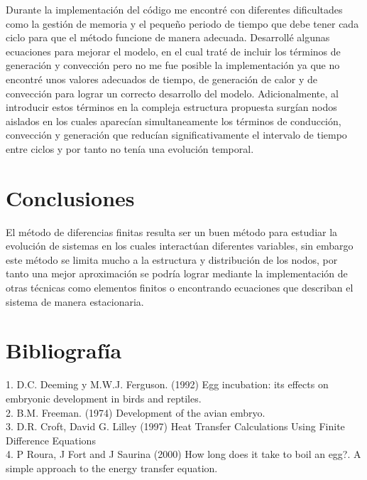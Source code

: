 \documentclass{article}
\begin{document}
	Durante la implementación del código me encontré con diferentes dificultades como la gestión de memoria y el pequeño periodo de tiempo que debe tener cada ciclo para que el método funcione de manera adecuada. Desarrollé algunas ecuaciones para mejorar el modelo, en el cual traté de incluir los términos de generación y convección pero no me fue posible la implementación ya que no encontré unos valores adecuados de tiempo, de generación de calor y de convección para lograr un correcto desarrollo del modelo. Adicionalmente, al introducir estos términos en la compleja estructura propuesta surgían nodos aislados en los cuales aparecían simultaneamente los términos de conducción, convección y generación que reducían significativamente el intervalo de tiempo entre ciclos y por tanto no tenía una evolución temporal.

	\section{Conclusiones}
	
	El método de diferencias finitas resulta ser un buen método para estudiar la evolución de sistemas en los cuales interactúan diferentes variables, sin embargo este método se limita mucho a la estructura y distribución de los nodos, por tanto una mejor aproximación se podría lograr mediante la implementación de otras técnicas como elementos finitos o encontrando ecuaciones que describan el sistema de manera estacionaria.
	
		
	\section{Bibliografía}
	
	1. D.C. Deeming y M.W.J. Ferguson. (1992) Egg incubation: its effects on embryonic development in birds and reptiles.\\
	
	
	2. B.M. Freeman. (1974) Development of the avian embryo.\\
	
	3. D.R. Croft, David G. Lilley (1997) Heat Transfer Calculations Using Finite Difference Equations\\
	
	4. P Roura, J Fort and J Saurina (2000) How long does it take to boil an egg?. A simple approach to the energy transfer equation.\\
	
	
\end{document}
